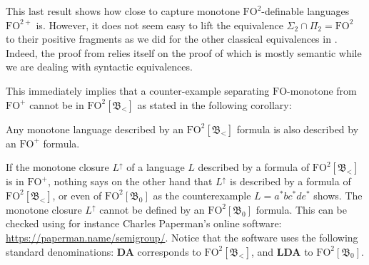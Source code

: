 \documentclass[a4paper,UKenglish,cleveref, autoref, thm-restate]{lipics-v2021}
\newcommand{\FO}{\mathrm{FO}}
\newcommand{\FOp}{\FO^+}
\newcommand{\FOtw}{\FO^2}
\newcommand{\FOtwp}{\FO^{2+}}
\newcommand{\bin}{\mathfrak{B}}
\begin{document}
This last result shows how close to capture monotone $\FOtw$-definable languages $\FOtwp$ is.
However, it does not seem easy to lift the equivalence $\Sigma_2 \cap \Pi_2 = \FOtw$ to their positive fragments as we did for the other classical equivalences in .
Indeed, the proof from \cite{OneQuantifierAlternation} relies itself on the proof of \cite{PolynomialClosure} which is mostly semantic while we are dealing with syntactic equivalences.



This immediately implies that a counter-example separating $\FO$-monotone from $\FOp$ cannot be in $\FOtw[\bin_<]$ as stated in the following corollary:

\begin{corollary}\label{FO2clot}
    Any monotone language described by an $\FOtw[\bin_<]$ formula is also described by an $\FOp$ formula.
\end{corollary}







































If the monotone closure $L^{\uparrow}$ of a language $L$ described by a formula of $\FOtw[\bin_<]$ is in $\FOp$, nothing says on the other hand that $L^{\uparrow}$ is described by a formula of $\FOtw[\bin_<]$, or even of $\FOtw[\bin_0]$ as the counterexample $L=a^*bc^*de^*$ shows.
The monotone closure $L^{\uparrow}$ cannot be defined by an $\FOtw[\bin_0]$ formula.
This can be checked using for instance Charles Paperman's online software: \url{https://paperman.name/semigroup/}.
Notice that the software uses the following standard denominations: \textbf{DA} corresponds to $\FOtw[\bin_<]$, and \textbf{LDA} to $\FOtw[\bin_0]$.
\end{document}
